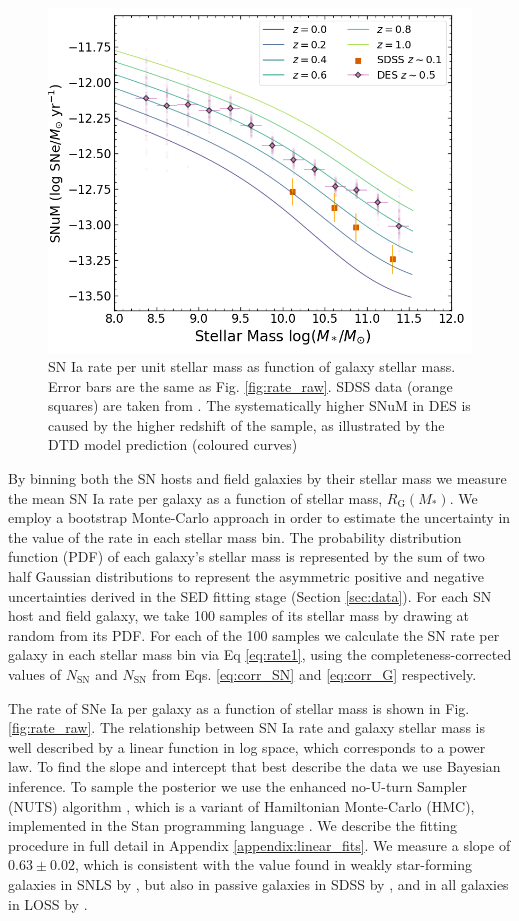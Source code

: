 \documentclass[fleqn,usenatbib]{mnras}
\begin{document}
\begin{figure}
    \centering
    \includegraphics[width=.5\textwidth]{figs/SNuM.png}
    \caption{SN Ia rate per unit stellar mass as function of galaxy stellar mass. Error bars are the same as Fig. \ref{fig:rate_raw}. SDSS data (orange squares) are taken from \citet{Graur2013}. The systematically higher SNuM in DES is caused by the higher redshift of the sample, as illustrated by the DTD model prediction (coloured curves) }%
    \label{fig:snum}
\end{figure}
By binning both the SN hosts and field galaxies by their stellar mass we measure the mean SN Ia rate per galaxy as a function of stellar mass, $R_{\mathrm{G}}(M_*)$. We employ a bootstrap Monte-Carlo approach in order to estimate the uncertainty in the value of the rate in each stellar mass bin. The probability distribution function (PDF) of each galaxy's stellar mass is represented by the sum of two half Gaussian distributions to represent the asymmetric positive and negative uncertainties derived in the SED fitting stage (Section \ref{sec:data}). For each SN host and field galaxy, we take 100 samples of its stellar mass by drawing at random from its PDF. For each of the 100 samples we calculate the SN rate per galaxy in each stellar mass bin via Eq \ref{eq:rate1}, using the completeness-corrected values of $N_{\mathrm{SN}}$ and $N_{\mathrm{SN}}$ from Eqs. \ref{eq:corr_SN} and \ref{eq:corr_G} respectively. 

The rate of SNe Ia per galaxy as a function of stellar mass is shown in Fig. \ref{fig:rate_raw}. The relationship between SN Ia rate and galaxy stellar mass is well described by a linear function in log space, which corresponds to a power law. To find the slope and intercept that best describe the data we use Bayesian inference. To sample the posterior we use the enhanced no-U-turn Sampler (NUTS) algorithm \citep{Betancourt2017}, which is a variant of Hamiltonian Monte-Carlo (HMC), implemented in the Stan programming language \citep{Carpenter2017}. We describe the fitting procedure in full detail in Appendix \ref{appendix:linear_fits}. We measure a slope of $0.63\pm0.02$, which is consistent with the value found in weakly star-forming galaxies in SNLS by \citet{Sullivan2006}, but also in passive galaxies in SDSS by \citet{Smith2012}, and in all galaxies in LOSS by \citet{Li2011a}. 
\end{document}
